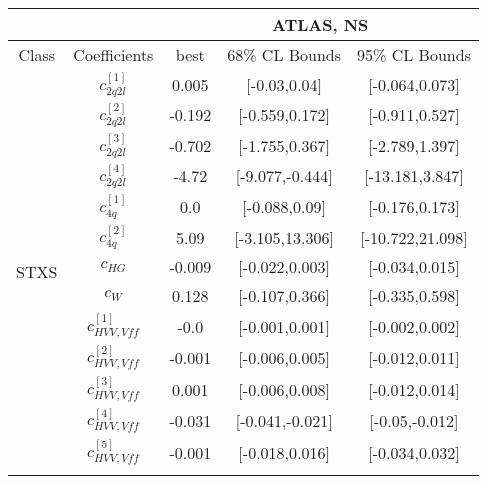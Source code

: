 \documentclass{article}
\begin{document}
\begin{table}[H]
\centering
\begin{tabular}{|c|c|c|c|c|}
\hline
 &  & \multicolumn{3}{c|}{ATLAS, NS} \\ \hline
Class & Coefficients & best & 68\% CL Bounds & 95\% CL Bounds\\ \hline
\multirow{28}{*}{STXS}
 & $c_{2q2l}^{[1]}$ & 0.005                             & [-0.03,0.04]                                 & [-0.064,0.073] \\ \cline{2-5}
 & $c_{2q2l}^{[2]}$ & -0.192                             & [-0.559,0.172]                                 & [-0.911,0.527] \\ \cline{2-5}
 & $c_{2q2l}^{[3]}$ & -0.702                             & [-1.755,0.367]                                 & [-2.789,1.397] \\ \cline{2-5}
 & $c_{2q2l}^{[4]}$ & -4.72                             & [-9.077,-0.444]                                 & [-13.181,3.847] \\ \cline{2-5}
 & $c_{4q}^{[1]}$ & 0.0                             & [-0.088,0.09]                                 & [-0.176,0.173] \\ \cline{2-5}
 & $c_{4q}^{[2]}$ & 5.09                             & [-3.105,13.306]                                 & [-10.722,21.098] \\ \cline{2-5}
 & $c_{HG}$ & -0.009                             & [-0.022,0.003]                                 & [-0.034,0.015] \\ \cline{2-5}
 & $c_{W}$ & 0.128                             & [-0.107,0.366]                                 & [-0.335,0.598] \\ \cline{2-5}
 & $c_{HVV,Vff}^{[1]}$ & -0.0                             & [-0.001,0.001]                                 & [-0.002,0.002] \\ \cline{2-5}
 & $c_{HVV,Vff}^{[2]}$ & -0.001                             & [-0.006,0.005]                                 & [-0.012,0.011] \\ \cline{2-5}
 & $c_{HVV,Vff}^{[3]}$ & 0.001                             & [-0.006,0.008]                                 & [-0.012,0.014] \\ \cline{2-5}
 & $c_{HVV,Vff}^{[4]}$ & -0.031                             & [-0.041,-0.021]                                 & [-0.05,-0.012] \\ \cline{2-5}
 & $c_{HVV,Vff}^{[5]}$ & -0.001                             & [-0.018,0.016]                                 & [-0.034,0.032] \\ \cline{2-5}

\end{tabular}
\end{table}
\end{document}
